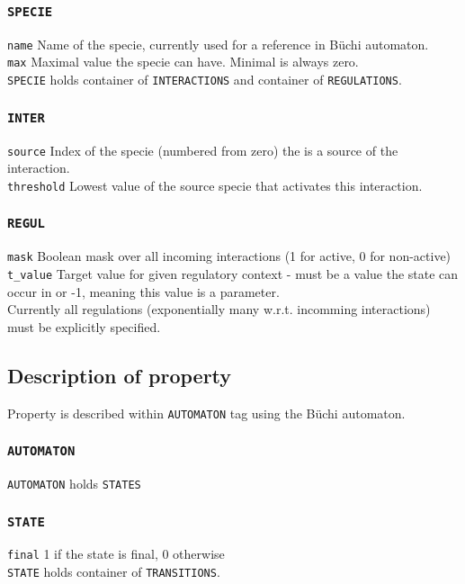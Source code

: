 \documentclass[12pt]{article}
\begin{document}
\subsubsection {\texttt{SPECIE}}
\texttt{name} Name of the specie, currently used for a reference in B\"{u}chi automaton. \\
\texttt{max} Maximal value the specie can have. Minimal is always zero.\\
\texttt{SPECIE} holds container of \texttt{INTERACTIONS} and container of \texttt{REGULATIONS}. 

\subsubsection {\texttt{INTER}}
\texttt{source} Index of the specie (numbered from zero) the is a source of the interaction. \\
\texttt{threshold} Lowest value of the source specie that activates this interaction.

\subsubsection {\texttt{REGUL}}
\texttt{mask} Boolean mask over all incoming interactions (1 for active, 0 for non-active) \\
\texttt{t\_value} Target value for given regulatory context - must be a value the state can occur in or -1, meaning this value is a parameter. \\
Currently all regulations (exponentially many w.r.t. incomming interactions) must be explicitly specified.

\subsection{Description of property}
Property is described within \texttt{AUTOMATON} tag using the B\"{u}chi automaton.

\subsubsection {\texttt{AUTOMATON} }
\texttt{AUTOMATON} holds \texttt{STATES}

\subsubsection {\texttt{STATE}}
\texttt{final} 1 if the state is final, 0 otherwise\\
\texttt{STATE} holds container of \texttt{TRANSITIONS}.
\end{document}
